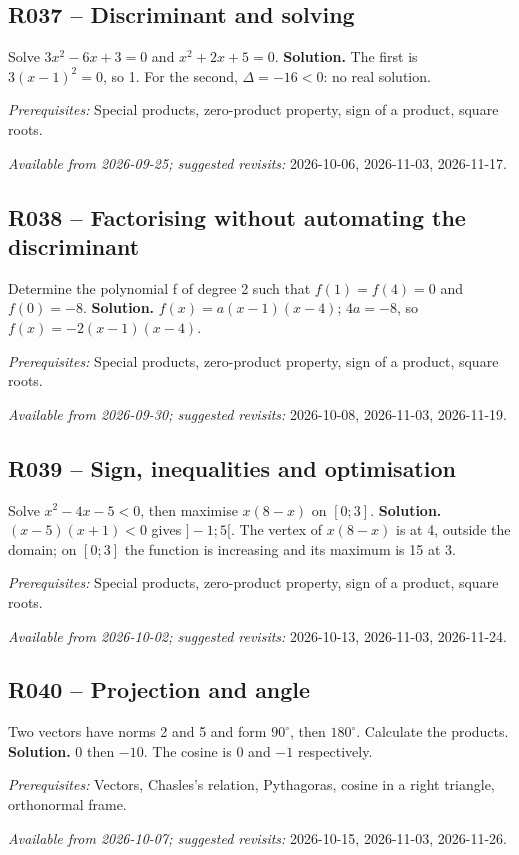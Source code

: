 \subsection*{R037 -- Discriminant and solving}\label{R037}
Solve $3x^2-6x+3=0$ and $x^2+2x+5=0$.
\ifprof\textbf{Solution.} The first is $3(x-1)^2=0$, so 1. For the second, $\Delta=-16<0$: no real solution.\par\textit{Prerequisites:} Special products, zero-product property, sign of a product, square roots.\par\textit{Available from 2026-09-25; suggested revisits:} 2026-10-06, 2026-11-03, 2026-11-17.\fi
{}\subsection*{R038 -- Factorising without automating the discriminant}\label{R038}
Determine the polynomial f of degree 2 such that $f(1)=f(4)=0$ and $f(0)=-8$.
\ifprof\textbf{Solution.} $f(x)=a(x-1)(x-4)$; $4a=-8$, so $f(x)=-2(x-1)(x-4)$.\par\textit{Prerequisites:} Special products, zero-product property, sign of a product, square roots.\par\textit{Available from 2026-09-30; suggested revisits:} 2026-10-08, 2026-11-03, 2026-11-19.\fi
{}\subsection*{R039 -- Sign, inequalities and optimisation}\label{R039}
Solve $x^2-4x-5<0$, then maximise $x(8-x)$ on $[0;3]$.
\ifprof\textbf{Solution.} $(x-5)(x+1)<0$ gives $]-1;5[$. The vertex of $x(8-x)$ is at 4, outside the domain; on $[0;3]$ the function is increasing and its maximum is 15 at 3.\par\textit{Prerequisites:} Special products, zero-product property, sign of a product, square roots.\par\textit{Available from 2026-10-02; suggested revisits:} 2026-10-13, 2026-11-03, 2026-11-24.\fi
{}\subsection*{R040 -- Projection and angle}\label{R040}
Two vectors have norms 2 and 5 and form $90^\circ$, then $180^\circ$. Calculate the products.
\ifprof\textbf{Solution.} $0$ then $-10$. The cosine is 0 and $-1$ respectively.\par\textit{Prerequisites:} Vectors, Chasles's relation, Pythagoras, cosine in a right triangle, orthonormal frame.\par\textit{Available from 2026-10-07; suggested revisits:} 2026-10-15, 2026-11-03, 2026-11-26.\fi
